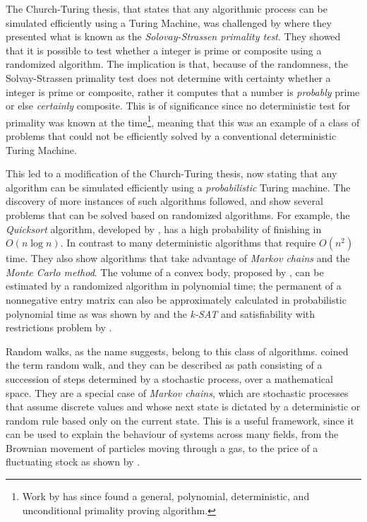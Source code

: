 \documentclass[../../dissertation.tex]{subfiles}
\begin{document}
The Church-Turing thesis, that states that any algorithmic process can
be simulated efficiently using a Turing Machine, was challenged by
\cite{solvaystrassen77} where they presented what is known as the
\textit{Solovay-Strassen primality test}. They showed that it is possible to
test whether a integer is prime or composite using a randomized algorithm. The
implication is that, because of the randomness, the Solvay-Strassen primality
test does not determine with certainty whether a integer is prime or composite,
rather it computes that a number is \textit{probably} prime or else
\textit{certainly} composite. This is of significance since no deterministic
test for primality was known at the time\footnote{Work by \cite{agrawal02} has since found a general, polynomial, deterministic, and unconditional primality proving algorithm.}, meaning that this was
an example of a class of problems that could not be efficiently solved by a
conventional deterministic Turing Machine.\par

This led to a modification of the Church-Turing thesis, now stating that any
algorithm can be simulated efficiently using a \textit{probabilistic} Turing
machine. The discovery of more instances of such algorithms followed,
\cite{motwani1995} and \cite{papadimitrious1994} show several problems that can
be solved based on randomized algorithms. For example, the \textit{Quicksort}
algorithm, developed by \cite{hoare61}, has a high probability of finishing in
$O(n \log{n})$. In contrast to many deterministic algorithms that require
$O(n^2)$ time. They also show algorithms that take advantage of \textit{Markov
chains} and the \textit{Monte Carlo method}. The volume of a convex body,
proposed by \cite{dyer1991}, can be estimated by a randomized algorithm in
polynomial time; the permanent of a nonnegative entry matrix can also be
approximately calculated in probabilistic polynomial time as was shown by
\cite{jerrum2001} and the \textit{k-SAT} and satisfiability with restrictions
problem by \cite{schoning1999}. \par

Random walks, as the name suggests, belong to this class of algorithms.
\cite{kpearson1905} coined the term random walk, and they can be described as
path consisting of a succession of steps determined by a stochastic process,
over a mathematical space. They are a special case of \textit{Markov chains},
which are stochastic processes that assume discrete values and whose next state
is dictated by a deterministic or random rule based only on the current state.
This is a useful framework, since it can be used to explain the behaviour of
systems across many fields, from the Brownian movement of particles moving
through a gas, to the price of a fluctuating stock as shown by
\cite{cootner67}.\par
\end{document}
